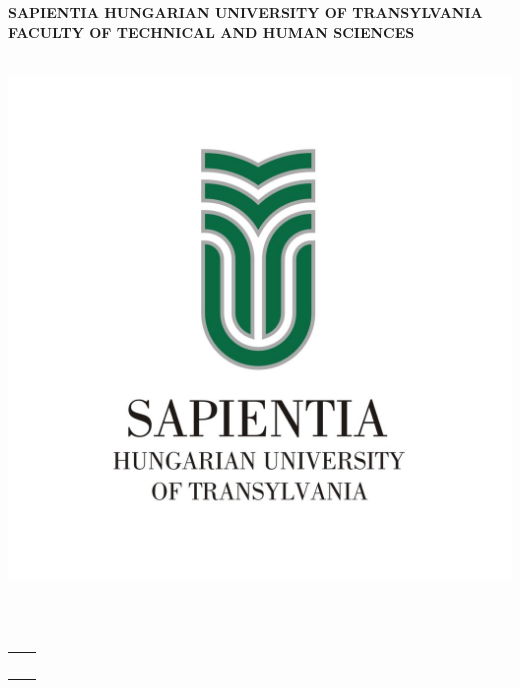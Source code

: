 
\begin{titlepage}
	\begin{center}

		\large{\bfseries SAPIENTIA HUNGARIAN UNIVERSITY OF TRANSYLVANIA} \\
		\large{\bfseries FACULTY OF TECHNICAL AND HUMAN SCIENCES} \\
		\large{\bfseries \szakEN} \\[2.5cm]
		
		\begin{center}
		\includegraphics[scale=2]{images/sapientia-en}
		\end{center}
		\vspace{0.4cm}
		\Large{\Large  \cimEN}\\[0.8cm]
		\vspace{0.2cm}
		\textsc{\Large \bfseries \dolgozattipusEN}\\[2cm]
		
		{
			\large
			\renewcommand{\arraystretch}{0.85}
			\begin{tabular}{cc}
				 \makebox[6.5cm]{Scientific advisor:} & \makebox[6.5cm]{Student:} \\ \noalign{\smallskip}
				 \makebox[6.5cm]{\temavezetoA,} & \makebox[6.5cm]{\szerzo} \\ {\temavezetoAfokozatEn} \\
				 \makebox[6.5cm]{\temavezetoB,} & \\ {\temavezetoBfokozatEn} \\
			\end{tabular}
		}
		
		\vfill
		{\large \bfseries \ev}
	\end{center}
\end{titlepage}